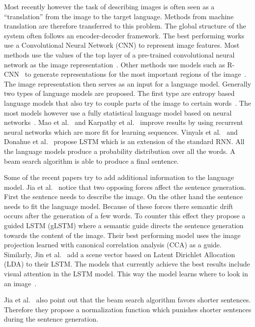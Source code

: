 \documentclass[twoside,twocolumn]{article}
\begin{document}
Most recently however the task of describing images is often seen as a  ``translation'' from the image to the target language.
Methods from machine translation are therefore transferred to this problem. The global structure of the system often follows an encoder-decoder framework.
The best performing works use a Convolutional Neural Network (CNN) to represent image features. Most methods use the values of the top layer of a pre-trained convolutional neural network as the image representation~\cite{Donahue2015,Mao2014a,Karpathy2015,Google}. Other methods use models such as R-CNN~\cite{Girshick2014} to generate representations for the most important regions of the image~\cite{Jin2015,Mitchell2015}.
The image representation then serves as an input for a language model.
Generally two types of language models are proposed. The first type are entropy based language models that also try to couple parts of the image to certain words~\cite{Lebret2015,Mitchell2015}. The most models however use a fully statistical language model based on neural networks~\cite{Kiros2013}. Mao et al.~\cite{Mao2014a} and Karpathy et al.~\cite{Karpathy2015} improve results by using recurrent neural networks which are more fit for learning sequences. Vinyals et al.~\cite{Google} and Donahue et al.~\cite{Donahue2015} propose LSTM which is an extension of the standard RNN.
All the language models produce a probability distribution over all the words. A beam search algorithm is able to produce a final sentence.

Some of the recent papers try to add additional information to the language model. Jia et al.~\cite{Fernando2015} notice that two opposing forces affect the sentence generation. First the sentence needs to describe the image. On the other hand the sentence needs to fit the language model. Because of these forces there semantic drift occurs after the generation of a few words. To counter this effect they propose a guided LSTM (gLSTM) where a semantic guide directs the sentence generation towards the content of the image. Their best performing model uses the image projection learned with canonical correlation analysis (CCA) as a guide. 
Similarly, Jin et al.~\cite{Jin2015} add a scene vector based on Latent Dirichlet Allocation\cite{Blei2012} (LDA) to their LSTM.
The models that currently achieve the best results include visual attention in the LSTM model. This way the model learns where to look in an image~\cite{Jin2015,Xu2015}.

Jia et al.~\cite{Fernando2015} also point out that the beam search algorithm favors shorter sentences. Therefore they propose a normalization function which punishes shorter sentences during the sentence generation.
\end{document}
